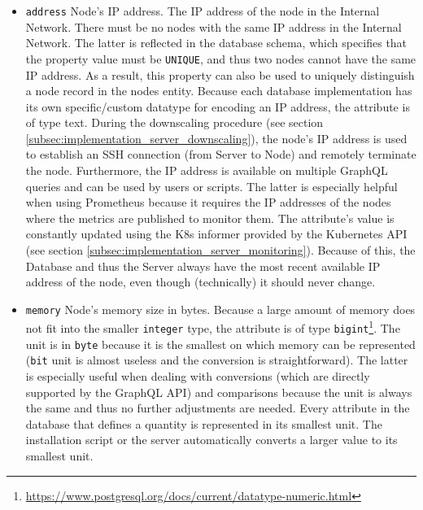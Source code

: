 \begin{itemize}
  \item \texttt{address}
    \newline
    Node's IP address.
    \newline
    The IP address of the node in the Internal Network. There must be no nodes
    with the same IP address in the Internal Network. The latter is reflected in
    the database schema, which specifies that the property value must be \texttt{UNIQUE},
    and thus two nodes cannot have the same IP address. As a result, this
    property can also be used to uniquely distinguish a node record in the nodes
    entity.
    \newline
    Because each database implementation has its own specific/custom datatype for
    encoding an IP address, the attribute is of type text.
    \newline
    During the downscaling procedure (see section
    \ref{subsec:implementation_server_downscaling}), the node's IP address is
    used to establish an SSH connection (from Server to Node) and remotely
    terminate the node. Furthermore, the IP address is available on multiple
    GraphQL queries and can be used by users or scripts. The latter is especially
    helpful when using Prometheus because it requires the IP addresses of the nodes
    where the metrics are published to monitor them.
    \newline
    The attribute's value is constantly updated using the K8s informer provided
    by the Kubernetes API (see section \ref{subsec:implementation_server_monitoring}).
    Because of this, the Database and thus the Server always have the most
    recent available IP address of the node, even though (technically) it should
    never change.

  \item \texttt{memory}
    \newline
    Node's memory size in bytes.
    \newline
    Because a large amount of memory does not fit into the smaller \texttt{integer}
    type, the attribute is of type \texttt{bigint}\footnote{\url{https://www.postgresql.org/docs/current/datatype-numeric.html}}.
    \newline
    The unit is in \texttt{byte} because it is the smallest on which memory can
    be represented (\texttt{bit} unit is almost useless and the conversion is
    straightforward). The latter is especially useful when dealing with
    conversions (which are directly supported by the GraphQL API) and
    comparisons because the unit is always the same and thus no further
    adjustments are needed.
    \newline
    Every attribute in the database that defines a quantity is represented in its
    smallest unit. The installation script or the server automatically converts
    a larger value to its smallest unit.


\end{itemize}
